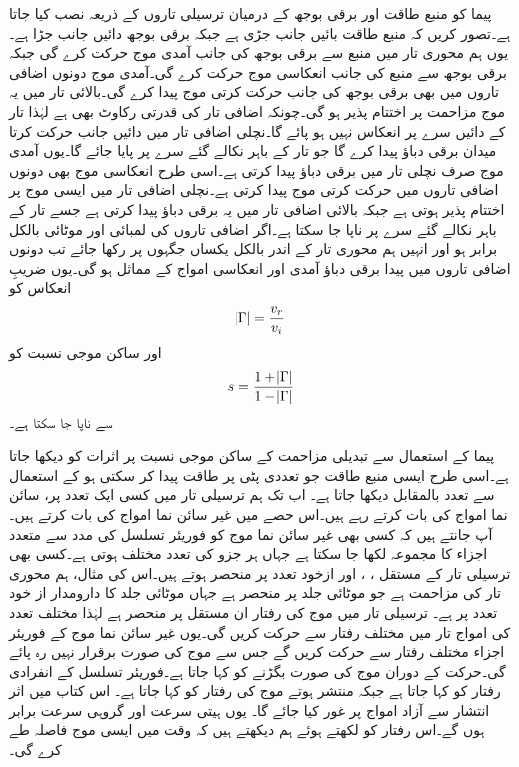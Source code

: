پیما کو منبع طاقت اور برقی بوجھ کے درمیان ترسیلی تاروں کے ذریعہ نصب کیا جاتا ہے۔تصور کریں کہ منبع طاقت بائیں جانب جڑی  ہے جبکہ برقی بوجھ دائیں جانب جڑا ہے۔یوں ہم محوری تار میں منبع سے برقی بوجھ کی جانب آمدی موج حرکت کرے گی جبکہ برقی بوجھ سے منبع کی جانب انعکاسی موج حرکت کرے گی۔آمدی موج دونوں اضافی تاروں میں بھی برقی بوجھ کی جانب حرکت کرتی موج پیدا کرے گی۔بالائی تار میں یہ موج مزاحمت  پر اختتام پذیر ہو گی۔چونکہ اضافی تار کی قدرتی رکاوٹ بھی  ہے لہٰذا تار کے دائیں سرے پر انعکاس نہیں ہو پائے گا۔نچلی اضافی تار میں دائیں جانب حرکت کرتا میدان  برقی دباؤ  پیدا کرے گا جو تار کے باہر نکالے گئے سرے پر پایا جائے گا۔یوں آمدی موج صرف نچلی تار میں برقی دباؤ پیدا کرتی ہے۔اسی طرح انعکاسی موج بھی دونوں اضافی تاروں میں حرکت کرتی موج پیدا کرتی ہے۔نچلی اضافی تار میں ایسی موج  پر اختتام پذیر ہوتی ہے جبکہ بالائی اضافی تار میں یہ  برقی دباؤ پیدا کرتی ہے جسے تار کے باہر نکالے گئے سرے پر ناپا جا سکتا ہے۔اگر اضافی تاروں کی لمبائی اور موٹائی بالکل برابر ہو اور انہیں ہم محوری تار کے اندر بالکل یکساں جگہوں پر رکھا جائے تب دونوں اضافی تاروں میں پیدا برقی دباؤ آمدی اور انعکاسی امواج کے مماثل ہو گی۔یوں ضریبِ انعکاس کو
\begin{align}
\abs{\Gamma}=\frac{v_r}{v_i}
\end{align}
اور ساکن موجی نسبت کو
\begin{align}
s=\frac{1+\abs{\Gamma}}{1-\abs{\Gamma}}
\end{align}
سے ناپا جا سکتا ہے۔

پیما کے استعمال سے  تبدیلی مزاحمت کے ساکن موجی نسبت پر اثرات کو دیکھا جاتا ہے۔اسی طرح ایسی منبع طاقت جو تعددی پٹی پر طاقت پیدا کر سکتی ہو کے استعمال سے تعدد بالمقابل  دیکھا جاتا ہے۔
اب تک ہم  ترسیلی تار میں کسی ایک تعدد پر،  سائن نما امواج کی بات کرتے رہے ہیں۔اس حصے میں غیر سائن نما امواج کی بات کرتے ہیں۔آپ جانتے ہیں کہ کسی بھی غیر سائن نما موج کو فوریئر تسلسل کی مدد سے متعدد اجزاء کا مجموعہ لکھا جا سکتا ہے جہاں ہر جزو کی تعدد مختلف ہوتی ہے۔کسی بھی ترسیلی تار کے مستقل ، ،  اور  ازخود تعدد پر منحصر ہوتے ہیں۔اس کی مثال، ہم محوری تار کی مزاحمت ہے جو موٹائی جلد پر منحصر ہے جہاں موٹائی جلد کا دارومدار از خود تعدد پر ہے۔ ترسیلی تار میں موج کی رفتار ان مستقل پر منحصر ہے لہٰذا مختلف تعدد کی امواج تار میں مختلف رفتار سے حرکت کریں گی۔یوں غیر سائن نما موج کے فوریئر اجزاء مختلف رفتار سے حرکت کریں گے جس سے موج کی صورت برقرار نہیں رہ پائے گی۔حرکت کے دوران موج کی صورت بگڑنے کو  کہا جاتا ہے۔فوریئر تسلسل کے انفرادی رفتار  کو  کہا جاتا ہے جبکہ منتشر ہوتے موج کی رفتار  کو  کہا جاتا ہے۔ اس کتاب میں اثر انتشار سے آزاد امواج پر غور کیا جائے گا۔ یوں ہیتی سرعت اور گروہی سرعت برابر ہوں گے۔اس رفتار کو  لکھتے ہوئے ہم دیکھتے ہیں کہ وقت  میں ایسی موج   فاصلہ طے کرے گی۔

